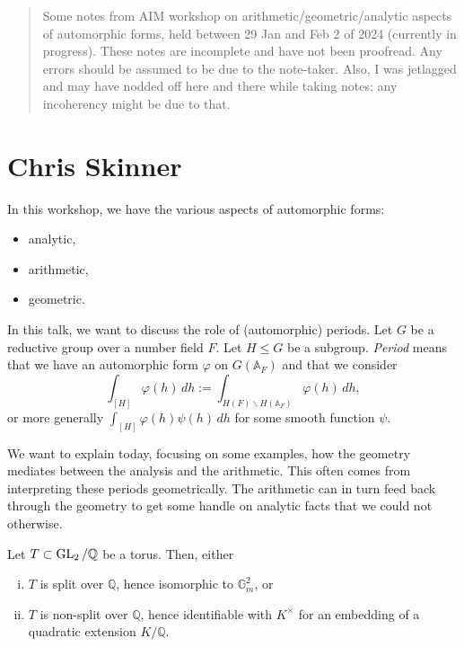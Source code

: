 \documentclass[reqno]{amsart} 
\begin{document}
\begin{abstract}
  Some notes from AIM workshop on arithmetic/geometric/analytic aspects of automorphic forms, held between 29 Jan and Feb 2 of 2024 (currently in progress).  These notes are incomplete and have not been proofread.  Any errors should be assumed to be due to the note-taker.  Also, I was jetlagged and may have nodded off here and there while taking notes; any incoherency might be due to that.
\end{abstract}

\section{Chris Skinner}
In this workshop, we have the various aspects of automorphic forms:
\begin{itemize}
\item analytic,
\item arithmetic,
\item geometric.
\end{itemize}
In this talk, we want to discuss the role of (automorphic) periods.  Let $G$ be a reductive group over a number field $F$.  Let $H \leq G$ be a subgroup. \emph{Period} means that we have an automorphic form $\varphi$ on $G(\mathbb{A}_F)$ and that we consider
\begin{equation*}
  \int_{[H]} \varphi(h) \, d h := \int_{H(F) \backslash H(\mathbb{A}_F)} \varphi(h) \, d h,
\end{equation*}
or more generally $\int_{[H]} \varphi(h) \psi(h) \, d h$ for some smooth function $\psi$.

We want to explain today, focusing on some examples, how the geometry mediates between the analysis and the arithmetic.  This often comes from interpreting these periods geometrically.  The arithmetic can in turn feed back through the geometry to get some handle on analytic facts that we could not otherwise.

Let $T \subset \operatorname{GL}_2 / \mathbb{Q}$ be a torus.  Then, either
\begin{enumerate}[(i)]
\item\label{enumerate:cnej2gipk2} $T$ is split over $\mathbb{Q}$, hence isomorphic to $\mathbb{G}_m^2$, or
\item\label{enumerate:cnej2giqmn} $T$ is non-split over $\mathbb{Q}$, hence identifiable with $K^\times$ for an embedding of a quadratic extension $K /\mathbb{Q}$.
\end{enumerate}
\end{document}
